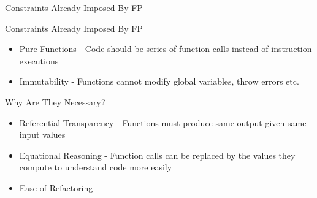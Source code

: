 \begin{section}{Constraints Already Imposed By FP}

\begin{frame}{Constraints Already Imposed By FP}
  \begin{itemize}
  \item Pure Functions - Code should be series of function calls instead of instruction executions
  \item Immutability - Functions cannot modify global variables, throw errors etc.
  \end{itemize}
\end{frame}

\begin{frame}{Why Are They Necessary?}
  \begin{itemize}
  \item Referential Transparency - Functions must produce same output given same input values
  \item Equational Reasoning - Function calls can be replaced by the values they compute to understand code more easily
  \item Ease of Refactoring
  \end{itemize}
\end{frame}

\end{section}

